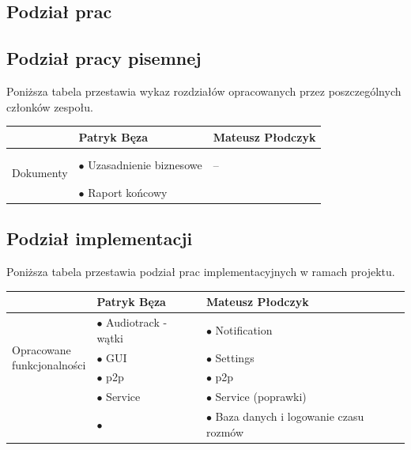 \documentclass[a4paper,titlepage]{article}
\theoremstyle{break}
\begin{document}
\begin{appendices}

\section{Podział prac}
\subsection{Podział pracy pisemnej}

Poniższa tabela przestawia wykaz rozdziałów opracowanych przez poszczególnych członków zespołu.

\begin{table}[H]
\center
\begin{tabular}{p{2.5cm}|p{5cm}|p{5cm}}
& Patryk Bęza & Mateusz Płodczyk \\\hline\hline
\parbox{3cm}{\ \\Dokumenty} & $\bullet$ Uzasadnienie biznesowe & --\\
& $\bullet$ Raport końcowy & \\
\end{tabular}
\end{table}

\subsection{Podział implementacji}

Poniższa tabela przestawia podział prac implementacyjnych w ramach projektu.

\begin{table}[H]
\center
\begin{tabular}{p{2.5cm}|p{5cm}|p{5cm}}
& Patryk Bęza & Mateusz Płodczyk \\\hline\hline
\multirow{3}{*}{\parbox{3cm}{\ \\Opracowane \\funkcjonalności}} & $\bullet$ Audiotrack - wątki & $\bullet$ Notification\\
& $\bullet$ GUI & $\bullet$ Settings \\
& $\bullet$ p2p & $\bullet$ p2p \\
& $\bullet$ Service & $\bullet$ Service (poprawki) \\
& $\bullet$  & $\bullet$ Baza danych i logowanie czasu rozmów \\
\end{tabular}
\end{table}

\end{appendices}


\clearpage
\renewcommand\refname{Linki}


\end{document}

